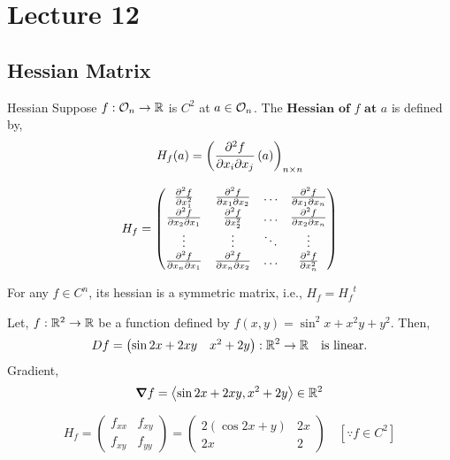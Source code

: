 \documentclass[../Analysis-3.tex]{subfiles}
\begin{document}
\chapter*{Lecture 12} %
\setcounter{chapter}{12} %
\setcounter{section}{0}

\section{Hessian Matrix}

\begin{Def}{Hessian}{}
  Suppose $f : \mathcal{O}_{n} \to \mathbb{R}$ is $C^2$ at $a \in \mathcal{O}_{n} $. The $\textbf{Hessian of $f$ at $a$}$ is defined by, \[ H_f(a) = \left( \pdv{f}{x_i}{x_j}\left( a \right) \right)_{n \times n} \]
\end{Def}

\[ H_{f} = \begin{pmatrix}
    \pdv[2]{f}{x_1}   & \pdv{f}{x_1}{x_2} & \ldots & \pdv{f}{x_1}{x_n} \\
    \pdv{f}{x_2}{x_1} & \pdv[2]{f}{x_2}   & \ldots & \pdv{f}{x_2}{x_n} \\
    \vdots            & \vdots            & \ddots & \vdots            \\
    \pdv{f}{x_n}{x_1} & \pdv{f}{x_n}{x_2} & \ldots & \pdv[2]{f}{x_n}
  \end{pmatrix} \]

\begin{noteBox}
  For any $ f \in C^n $, its hessian is a symmetric matrix, i.e., $H_f = {H_f}^t$
\end{noteBox}

\begin{Eg}{}{}
  Let, $f : \mathbb{R}^2 \to \mathbb{R}$ be a function defined by $f(x,y) = \sin^2 x + x^2y + y^2$. Then,
  \[Df = \begin{pmatrix}
      \sin2x + 2xy & x^2 + 2y
    \end{pmatrix} :  \mathbb{R}^2 \to \mathbb{R} \quad \text{is linear.} \]
  Gradient, \[\grad f = \left\langle \sin2x + 2xy, x^2 + 2y \right\rangle \in \mathbb{R}^2 \]

  \[ H_f = \begin{pmatrix}
      f_{xx} & f_{xy} \\
      f_{xy} & f_{yy}
    \end{pmatrix} = \begin{pmatrix}
      2( \cos2x + y) & 2x \\
      2x             & 2
    \end{pmatrix} \quad [ \because  f \in C^2] \]

\end{Eg}
\end{document}
